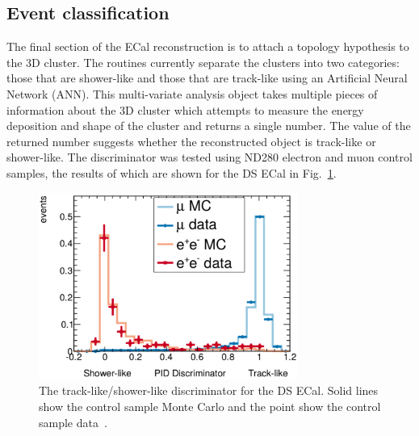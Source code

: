 \subsection{Event classification}
\label{subsec:ECalParticleIdentification}
The final section of the ECal reconstruction is to attach a topology hypothesis to the 3D cluster.  The routines currently separate the clusters into two categories: those that are shower-like and those that are track-like using an Artificial Neural Network (ANN).  This multi-variate analysis object takes multiple pieces of information about the 3D cluster which attempts to measure the energy deposition and shape of the cluster and returns a single number.  The value of the returned number suggests whether the reconstructed object is track-like or shower-like. The discriminator was tested using ND280 electron and muon control samples, the results of which are shown for the DS ECal in Fig.~\ref{fig:ECalTrShVal}.

\begin{figure}
  \centering
  \includegraphics[width=8.5cm]{images/software/ecal_trshval.pdf}
  \caption{The track-like/shower-like discriminator for the DS ECal.  Solid lines show the control sample Monte Carlo and the point show the control sample data~\cite{1748-0221-8-10-P10019}.}
  \label{fig:ECalTrShVal}
\end{figure}


